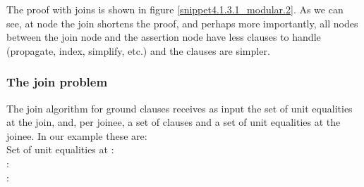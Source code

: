 The proof with joins is shown in figure \ref{snippet4.1.3.1_modular.2}.
As we can see, at node  the join shortens the proof, and perhaps more importantly, 
all nodes between the join node and the assertion node have less clauses to handle (propagate, index, simplify, etc.) and the clauses are simpler.



%
%
%
%
%

\subsubsection*{The join problem}
The join algorithm for ground clauses receives as input the set of unit equalities at the join, and, per joinee, a set of clauses and a set of unit equalities at the joinee. In our example these are:\\
Set of unit equalities at  : \m{\emptyset}\\
: \\
: \\
\bigskip

